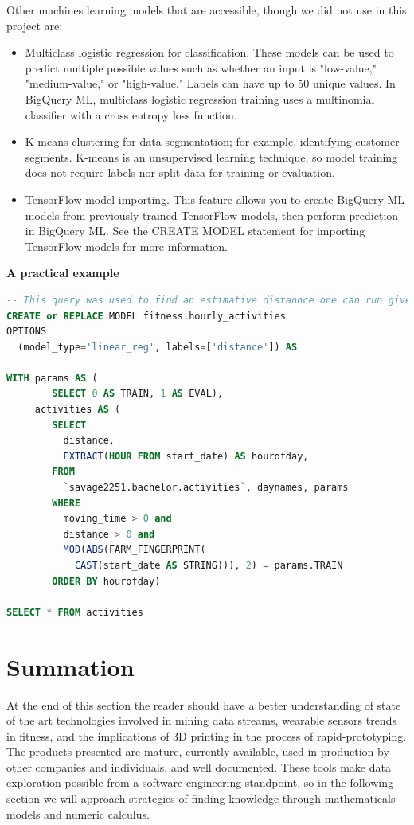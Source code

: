 Other machines learning models that are accessible, though we did not use in this project are:
\begin{itemize}
    \item{Multiclass logistic regression for classification. These models can be used to predict multiple possible values such as whether an input is "low-value," "medium-value," or "high-value." Labels can have up to 50 unique values. In BigQuery ML, multiclass logistic regression training uses a multinomial classifier with a cross entropy loss function.}
    \item{K-means clustering for data segmentation; for example, identifying customer segments. K-means is an unsupervised learning technique, so model training does not require labels nor split data for training or evaluation.}
    \item{TensorFlow model importing. This feature allows you to create BigQuery ML models from previously-trained TensorFlow models, then perform prediction in BigQuery ML. See the CREATE MODEL statement for importing TensorFlow models for more information.}
\end{itemize}

\vspace{0.4cm}
\textbf{A practical example}
\vspace{0.4cm}

\begin{lstlisting}[language=SQL, caption=BigQuery ML query example]
-- This query was used to find an estimative distannce one can run given as input the starting hour of the event.
CREATE or REPLACE MODEL fitness.hourly_activities
OPTIONS
  (model_type='linear_reg', labels=['distance']) AS

WITH params AS ( 
        SELECT 0 AS TRAIN, 1 AS EVAL),
     activities AS (
        SELECT 
          distance,
          EXTRACT(HOUR FROM start_date) AS hourofday,
        FROM 
          `savage2251.bachelor.activities`, daynames, params
        WHERE
          moving_time > 0 and 
          distance > 0 and 
          MOD(ABS(FARM_FINGERPRINT(
            CAST(start_date AS STRING))), 2) = params.TRAIN
        ORDER BY hourofday)

SELECT * FROM activities
\end{lstlisting}

\section{Summation} 

At the end of this section the reader should have a better understanding of state of the art technologies involved in mining data streams, wearable sensors trends in fitness, and the implications of 3D printing in the process of rapid-prototyping. The products presented are mature, currently available, used in production by other companies and individuals, and well documented. These tools make data exploration possible from a software engineering standpoint, so in the following section we will approach strategies of finding knowledge through mathematicals models and numeric calculus.
